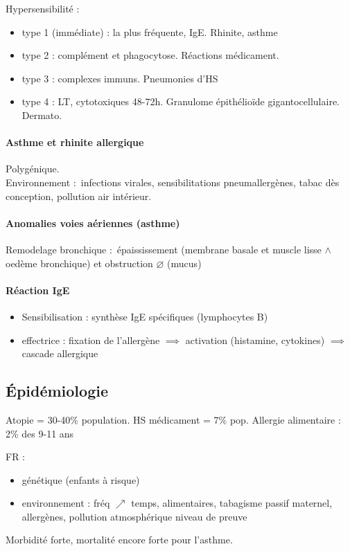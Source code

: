 \documentclass{article}
\newcommand*{\TakeFourierOrnament}[1]{{%
\fontencoding{U}\fontfamily{futs}\selectfont\char#1}}
\newcommand*{\danger}{\TakeFourierOrnament{66}}
\begin{document}
Hypersensibilité :
\begin{itemize}
  \item type 1 (immédiate) : la plus fréquente, IgE. Rhinite, asthme
  \item type 2 : complément et phagocytose. Réactions médicament.
  \item type 3 : complexes immuns. Pneumonies d'HS
  \item type 4 : LT, cytotoxiques 48-72h. Granulome épithélioïde gigantocellulaire.
    Dermato.
\end{itemize}

\paragraph{Asthme et rhinite allergique}
Polygénique.\\
Environnement : infections virales, sensibilitations pneumallergènes, tabac dès
conception, pollution air intérieur. 

\paragraph{Anomalies voies aériennes (asthme)}
Remodelage bronchique : épaississement (membrane basale et muscle lisse $\wedge$ oedème
bronchique) et obstruction $\diameter$ (mucus)

\paragraph{Réaction IgE}
\begin{itemize}
  \item Sensibilisation : synthèse IgE spécifiques (lymphocytes B)
  \item effectrice : fixation de l'allergène $\implies$ activation (histamine,
    cytokines) $\implies$ cascade allergique
\end{itemize}

\subsection{Épidémiologie}
Atopie = 30-40\% population. HS médicament = 7\% pop. Allergie alimentaire : 2\%
des 9-11 ans

FR : 
\begin{itemize}
  \item génétique (enfants à risque)
  \item environnement : fréq $\nearrow$ temps, alimentaires, tabagisme passif
    maternel, allergènes, pollution atmosphérique \danger niveau de preuve 
\end{itemize}
Morbidité forte, mortalité encore forte pour l'asthme.
\end{document}
